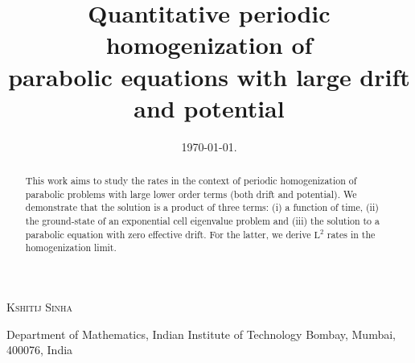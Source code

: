 \documentclass[preprint, 12pt]{amsart}
\numberwithin{equation}{section}
\numberwithin{equation}{section}
\begin{document}
\title[Parabolic equations with large drift and potential]{Quantitative periodic homogenization of\\ parabolic equations with large drift and potential}
\author[Kshitij Sinha]{}

\date{\today.}

\address{Department of Mathematics, Indian Institute of Technology Bombay, Mumbai, Maharastra, 400076, India}
\maketitle

\centerline{\scshape Kshitij Sinha}
\medskip
{\footnotesize
 \centerline{Department of Mathematics, Indian Institute of Technology Bombay, Mumbai, 400076, India}
}


\begin{abstract}
This work aims to study the rates in the context of periodic homogenization of parabolic problems with large lower order terms (both drift and potential). We demonstrate that the solution is a product of three terms: (i) a function of time, (ii) the ground-state of an exponential cell eigenvalue problem and (iii) the solution to a parabolic equation with zero effective drift. For the latter, we derive $\mathrm L^2$ rates in the homogenization limit.
\end{abstract}
\end{document}
